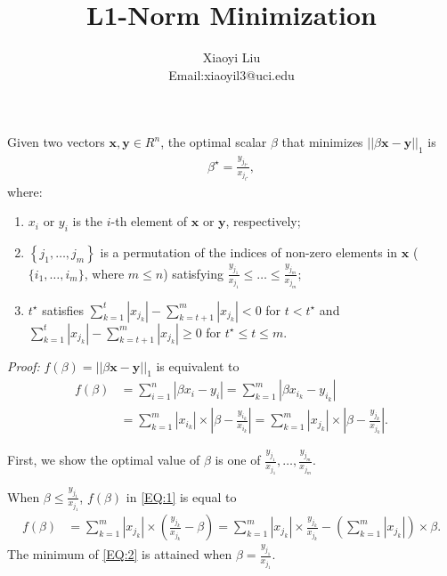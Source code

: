 \documentclass[12pt]{article}
\begin{document}
\title{L1-Norm Minimization}
\author{Xiaoyi Liu\\ Email:xiaoyil3@uci.edu}
\date{}
\maketitle

 Given two vectors ${\pmb x}, {\pmb y} \in R^n$, the optimal scalar $\beta$ that minimizes $\left|\left|\beta {\pmb x} - {\pmb y}\right|\right|_1$ is 
\begin{align}
\beta^{\star} = \frac{y_{{j}_{t^{\star}}}}{x_{{j}_{t^{\star}}}}, \nonumber
\end{align}
where:
 \begin{enumerate}
   \item $x_i$ or $y_i$ is the $i$-th element of ${\pmb x}$ or ${\pmb y}$, respectively;
   \item $\left\{{j}_1, \ldots, {j}_m\right\}$ is a permutation of the indices of non-zero elements in ${\pmb x}$ ($\{i_1, \ldots, i_m\}$, where $m \leq n$) satisfying $\frac{y_{{j}_1}}{x_{{j}_1}} \leq \ldots \leq \frac{y_{{j}_m}}{x_{{j}_m}}$;
   \item $t^{\star}$ satisfies $\sum_{k = 1}^t \left|x_{{j}_k}\right| - \sum_{k = t + 1}^m \left|x_{{j}_k}\right| < 0$ for $t < t^{\star}$ and $\sum_{k = 1}^t \left|x_{{j}_k}\right| - \sum_{k = t + 1}^m \left|x_{{j}_k}\right| \geq 0$ for $t^{\star} \leq t \leq m$.
 \end{enumerate}

\noindent
\textit{Proof:}
$f(\beta) = \left|\left|\beta {\pmb x} - {\pmb y}\right|\right|_1$ is equivalent to
\begin{align}
\label{EQ:1}
f(\beta) 
& = \sum_{i = 1}^n \left|\beta x_i - y_i\right| 
= \sum_{k = 1}^m \left|\beta x_{i_k} - y_{i_k}\right| \nonumber\\
& = \sum_{k = 1}^m \left|x_{i_k}\right|\times\left|\beta  - \frac{y_{i_k}}{x_{i_k}}\right|
 = \sum_{k = 1}^m \left|x_{{j}_k}\right|\times\left|\beta  - \frac{y_{{j}_k}}{x_{{j}_k}}\right|.
\end{align}

First, we show the optimal value of $\beta$ is one of $\frac{y_{{j}_1}}{x_{{j}_1}}, \ldots, \frac{y_{{j}_m}}{x_{{j}_m}}$.

When $\beta \leq \frac{y_{{j}_1}}{x_{{j}_1}}$, $f(\beta) $ in \eqref{EQ:1} is equal to
\begin{align}
\label{EQ:2}
f(\beta) 
& = \sum_{k = 1}^m \left|x_{{j}_k}\right|\times\left(\frac{y_{{j}_k}}{x_{{j}_k}} - \beta\right) = \sum_{k = 1}^m \left|x_{{j}_k}\right|\times\frac{y_{{j}_k}}{x_{{j}_k}} - \left(\sum_{k = 1}^m \left|x_{{j}_k}\right|\right) \times \beta.
\end{align}
The minimum of \eqref{EQ:2} is attained when $\beta = \frac{y_{{j}_1}}{x_{{j}_1}}$. 
\end{document}
